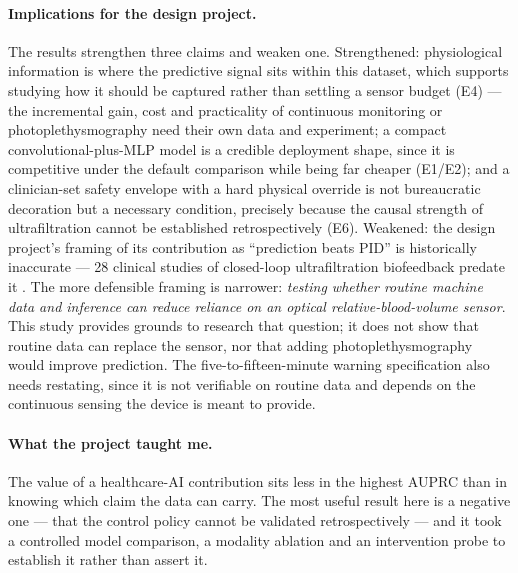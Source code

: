 \documentclass{article}
\begin{document}
\paragraph{Implications for the design project.} The results strengthen three claims and weaken one. Strengthened: physiological information is where the predictive signal sits within this dataset, which supports studying how
it should be captured rather than settling a sensor budget (E4) --- the incremental gain, cost and practicality of continuous
monitoring or photoplethysmography need their own data and experiment; a compact convolutional-plus-MLP model is a credible
deployment shape, since it is competitive under the default comparison while being far cheaper (E1/E2); and a clinician-set
safety envelope with a hard physical override is not bureaucratic decoration but a necessary condition, precisely because the
causal strength of ultrafiltration cannot be established retrospectively (E6). Weakened: the design project's framing of its contribution as ``prediction beats PID'' is historically inaccurate --- 28 clinical studies of closed-loop ultrafiltration biofeedback predate it \citep{dong2024closedloop}. The more defensible framing is narrower: \emph{testing whether routine machine data and inference can reduce reliance on an
optical relative-blood-volume sensor}. This study provides grounds to research that question; it does not show that routine
data can replace the sensor, nor that adding photoplethysmography would improve prediction. The five-to-fifteen-minute warning specification also needs restating, since it is not verifiable on routine data and depends on the continuous sensing the device is meant to provide.

\paragraph{What the project taught me.} The value of a healthcare-AI contribution sits less in the highest AUPRC than in knowing which claim the data can carry. The most useful result here is a negative one --- that the control policy cannot be validated retrospectively --- and it took a controlled model comparison, a modality ablation and an intervention probe to establish it rather than assert it.
\end{document}
